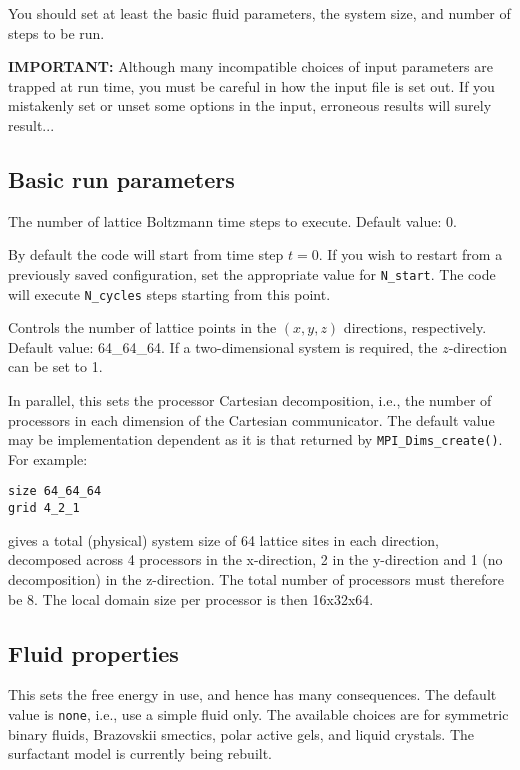 You should set at least the basic fluid parameters, the system
size, and number of steps to be run.

\textbf{IMPORTANT:} Although many incompatible choices of input
parameters are trapped at run time, you must be careful in how
the input file is set out. If you mistakenly set or unset some
options in the input, erroneous results will surely result...


\subsection{Basic run parameters}


The number of lattice Boltzmann time steps to execute. Default
value: 0.


By default the code will start from time step $t = 0$. If you 
wish to restart from a previously saved configuration, set
the appropriate value for \texttt{N\_start}. The code will
execute \texttt{N\_cycles} steps starting from this point.


Controls the number of lattice points in the $(x, y, z)$ directions,
respectively. Default value: 64\_64\_64. If a two-dimensional system
is required, the $z$-direction can be set to 1.


In parallel, this sets the processor Cartesian decomposition, i.e.,
the number of processors in each dimension of the Cartesian communicator.
The default value may be implementation dependent as it is that returned
by \texttt{MPI\_Dims\_create()}. For
example:
\begin{verbatim}
size 64_64_64
grid 4_2_1
\end{verbatim}
gives a total (physical) system size of 64 lattice sites in each
direction, decomposed across 4 processors in the x-direction, 2 in
the y-direction and 1 (no decomposition) in the z-direction. The
total number of processors must therefore be 8. The local domain
size per processor is then 16x32x64.


\subsection{Fluid properties}


This sets the free energy in use, and hence has many consequences.
The default value is \texttt{none}, i.e., use a simple fluid only.
The available choices are for symmetric binary fluids, Brazovskii
smectics, polar active gels, and liquid crystals. The surfactant
model is currently being rebuilt.

